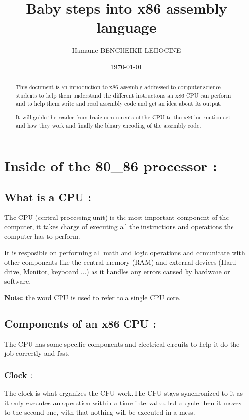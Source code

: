 \documentclass[10pt]{article}
\title{\centering\textbf{Baby steps into x86 assembly language}}
\author{Hamame BENCHEIKH LEHOCINE}
\date{\today}
\begin{document}
    
    \maketitle
    \newpage
    \begin{abstract}
        \centering
        This document is an introduction to x86 assembly addressed to computer science students 
        to help them understand the different instructions an x86 CPU can perform and to help them 
        write and read assembly code and get an idea about its output.


        It will guide the reader from basic components of the CPU to the x86 instruction set
        and how they work and finally the binary encoding of the assembly code.
    \end{abstract}
    \newpage
    \section{Inside of the 80\_86 processor : }
    \subsection{What is a CPU : }
    \tabto{20pt}The CPU (central processing unit) is the most important component of the computer,
     it takes charge of executing all the instructions and operations the computer has to perform.

    It is resposible on performing all math and logic operations 
    and comunicate with other components like the central memory 
    (RAM) and external devices (Hard drive, Monitor, keyboard ...) 
    as it handles any errors caused by hardware or software.
    
    \textbf{Note: }the word CPU is used to refer to a single CPU core.

    \subsection{Components of an x86 CPU : }
    The CPU has some specific components and electrical circuits to help it do the job correctly and fast.
    \subsubsection{Clock : }
    The clock is what organizes the CPU work.The CPU stays synchronized to it as it only executes an
     operation within a time interval called a cycle then it moves to the second one, with that nothing will be executed in a mess.
    
\end{document}
